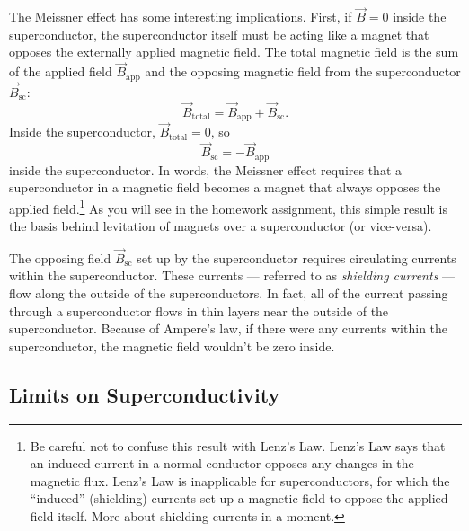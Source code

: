 The Meissner effect has some interesting implications.  First, if
$\vec B= 0$ inside the superconductor, the superconductor itself must
be acting like a magnet that opposes the externally applied magnetic
field.  The total magnetic field is the sum of the applied field
$\vec B_\text{app}$ and the opposing magnetic field from the
superconductor $\vec B_\text{sc}$:
\begin{equation}
\vec B_\text{total} = \vec B_\text{app} + \vec B_\text{sc}.
\end{equation}
Inside the superconductor, $\vec B_\text{total} = 0$, so
\begin{equation}
\vec B_\text{sc} = -\vec B_\text{app}
\end{equation}
inside the superconductor.  In words, the Meissner effect requires
that a superconductor in a magnetic field becomes a magnet that always
opposes the applied field.\footnote{Be careful not to confuse this
result with Lenz's Law.  Lenz's Law says that an induced current in a
normal conductor opposes any changes in the magnetic flux.  Lenz's Law
is inapplicable for superconductors, for which the ``induced''
(shielding) currents set up a magnetic field to oppose the applied
field itself.  More about shielding currents in a moment.} As you
will see in the homework assignment, this simple result is the basis
behind levitation of magnets over a superconductor (or vice-versa).

The opposing field $\vec B_\text{sc}$ set up by the superconductor
requires circulating currents within the superconductor.  These
currents --- referred to as {\em shielding currents} --- flow along
the outside of the superconductors.  In fact, all of the current
passing through a superconductor flows in thin layers near the outside
of the superconductor.  Because of Ampere's law, if there were any
currents within the superconductor, the magnetic field wouldn't be
zero inside.


\subsection{Limits on Superconductivity}
%

